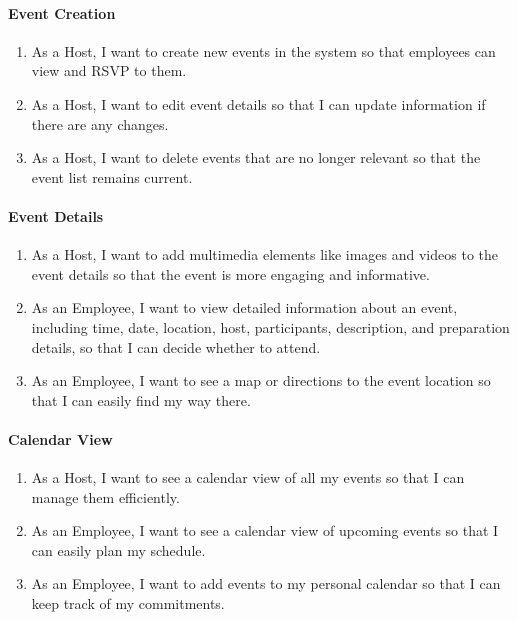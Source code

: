 \documentclass[a4paper,12pt]{article}
\begin{document}
\paragraph{Event Creation}

\begin{enumerate}
    \item As a Host, I want to create new events in the system so that employees can view and RSVP to them.
    \item As a Host, I want to edit event details so that I can update information if there are any changes.
    \item As a Host, I want to delete events that are no longer relevant so that the event list remains current.
\end{enumerate}

\paragraph{Event Details}

\begin{enumerate}
    \item As a Host, I want to add multimedia elements like images and videos to the event details so that the event 
    is more engaging and informative.
    \item As an Employee, I want to view detailed information about an event, including time, date, location, host, 
    participants, description, and preparation details, so that I can decide whether to attend.
    \item As an Employee, I want to see a map or directions to the event location so that I can easily find my way there.
\end{enumerate}

\paragraph{Calendar View}

\begin{enumerate}
    \item As a Host, I want to see a calendar view of all my events so that I can manage them efficiently.
    \item As an Employee, I want to see a calendar view of upcoming events so that I can easily plan my schedule.
    \item As an Employee, I want to add events to my personal calendar so that I can keep track of my commitments.
\end{enumerate}
\end{document}
